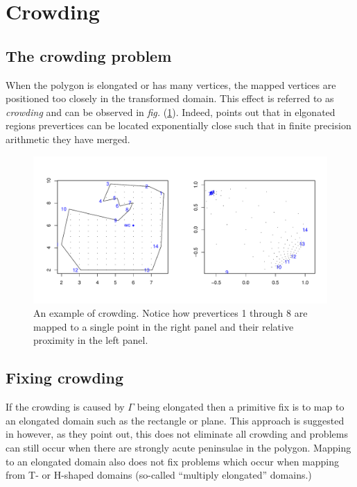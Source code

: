 \documentclass[a4paper,10pt]{amsart}
\newcommand{\fig}[1]{\emph{fig.} (\ref{#1})}
\begin{document}
\section{Crowding}

\subsection{The crowding problem}
When the polygon is elongated or has many vertices, the mapped vertices are positioned too closely in the transformed domain. This effect is referred to as \emph{crowding} and can be observed in \fig{crowdeddisk}. Indeed, \cite{howell90} points out that in elgonated regions prevertices can be located exponentially close such that in finite precision arithmetic they have merged.

\begin{figure} [tbp]
\centering
\includegraphics[scale=0.5]{figs/crowdeddisk.pdf}
\caption{An example of crowding. Notice how prevertices 1 through 8 are mapped to a single point in the right panel and their relative proximity in the left panel.}
\label{crowdeddisk}
\end{figure}

\subsection{Fixing crowding}

If the crowding is caused by $\Gamma$ being elongated then a  primitive fix is to map to an elongated domain such as the rectangle or plane. This approach is suggested in \cite{howell90} however, as they point out, this does not eliminate all crowding and problems can still occur when there are strongly acute peninsulae in the polygon. Mapping to an elongated domain also does not fix problems which occur when mapping from T- or H-shaped domains (so-called ``multiply elongated'' domains.)
\end{document}

